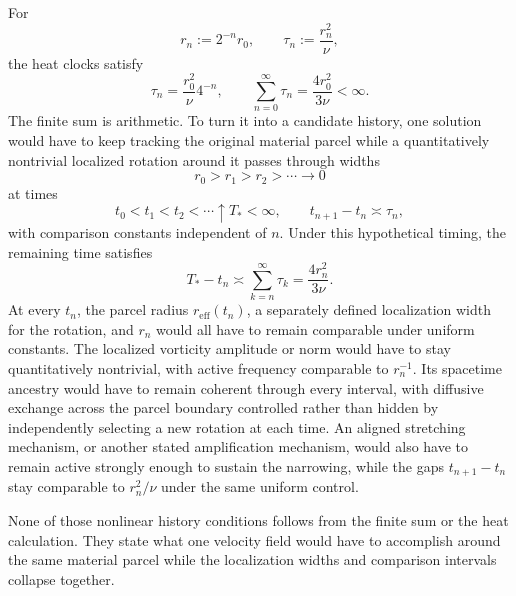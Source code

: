 
For
\[
  r_n:=2^{-n}r_0,
  \qquad
  \tau_n:=\frac{r_n^2}{\nu},
\]
the heat clocks satisfy
\[
  \tau_n
  =
  \frac{r_0^2}{\nu}4^{-n},
  \qquad
  \sum_{n=0}^{\infty}\tau_n
  =
  \frac{4r_0^2}{3\nu}
  <
  \infty.
\]
The finite sum is arithmetic. To turn it into a candidate history, one \NavierStokes{} solution would have to keep tracking the original material parcel while a quantitatively nontrivial localized rotation around it passes through widths
\[
  r_0>r_1>r_2>\cdots\longrightarrow0
\]
at times
\[
  t_0<t_1<t_2<\cdots\uparrow T_*<\infty,
  \qquad
  t_{n+1}-t_n\asymp\tau_n,
\]
with comparison constants independent of \(n\). Under this hypothetical timing, the remaining time satisfies
\[
  T_*-t_n
  \asymp
  \sum_{k=n}^{\infty}\tau_k
  =
  \frac{4r_n^2}{3\nu}.
\]
At every \(t_n\), the parcel radius \(r_{\mathrm{eff}}(t_n)\), a separately defined localization width for the rotation, and \(r_n\) would all have to remain comparable under uniform constants. The localized vorticity amplitude or norm would have to stay quantitatively nontrivial, with active frequency comparable to \(r_n^{-1}\). Its spacetime ancestry would have to remain coherent through every interval, with diffusive exchange across the parcel boundary controlled rather than hidden by independently selecting a new rotation at each time. An aligned stretching mechanism, or another stated amplification mechanism, would also have to remain active strongly enough to sustain the narrowing, while the gaps \(t_{n+1}-t_n\) stay comparable to \(r_n^2/\nu\) under the same uniform control.

None of those nonlinear history conditions follows from the finite sum or the heat calculation. They state what one velocity field would have to accomplish around the same material parcel while the localization widths and comparison intervals collapse together.
